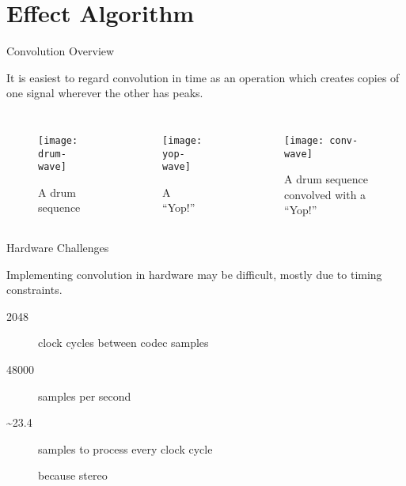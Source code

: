 \section{Effect Algorithm}


\begin{frame}{Convolution Overview}

    It is easiest to regard convolution in time as an operation which creates copies of one signal wherever the other has peaks.

    \begin{columns}[t]

        \begin{figure}
            \texttt{[image: drum-wave]}
            \caption{A drum sequence}
        \end{figure}

        \begin{figure}
            \texttt{[image: yop-wave]}
            \caption{A ``Yop!''}
        \end{figure}

        \begin{figure}
            \texttt{[image: conv-wave]}
            \caption{A drum sequence convolved with a ``Yop!''}
        \end{figure}

    \end{columns}

\end{frame}


\begin{frame}{Hardware Challenges}

    Implementing convolution in hardware may be difficult, mostly due to timing constraints.

    \begin{description}
        \item[2048] clock cycles between codec samples
        \item[48000] samples per second
        \item[\textasciitilde{}23.4] samples to process every clock cycle
        \item[] because stereo
    \end{description}

\end{frame}
